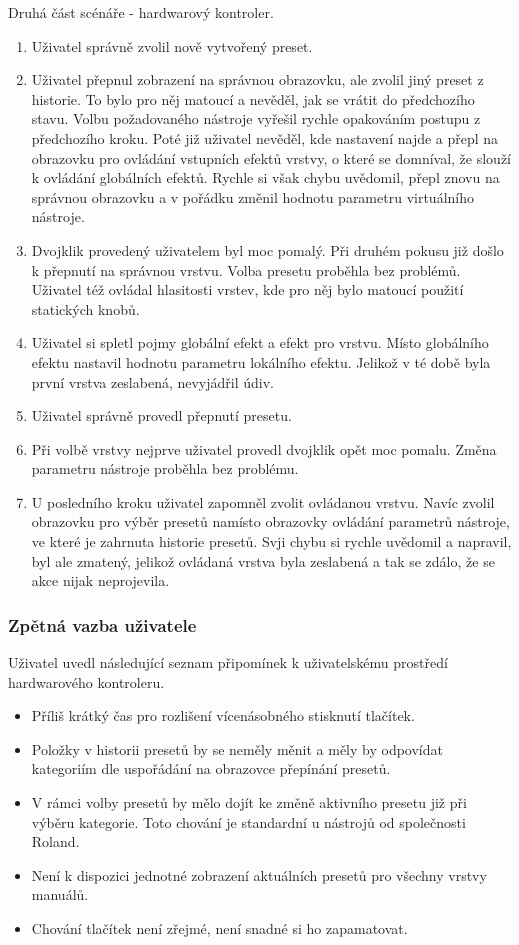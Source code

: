 \documentclass[thesis=M,czech]{FITthesis}[2019/03/06]
\begin{document}
			\noindent
			Druhá část scénáře - hardwarový kontroler.
			\begin{enumerate}
				\item Uživatel správně zvolil nově vytvořený preset.
				\item Uživatel přepnul zobrazení na správnou obrazovku, ale zvolil jiný preset z historie. To bylo pro něj matoucí a nevěděl, jak se vrátit do předchozího stavu. Volbu požadovaného nástroje vyřešil rychle opakováním postupu z předchozího kroku.
				Poté již uživatel nevěděl, kde nastavení najde a přepl na obrazovku pro ovládání vstupních efektů vrstvy, o které se domníval, že slouží k ovládání globálních efektů. Rychle si však chybu uvědomil, přepl znovu na správnou obrazovku a v pořádku změnil hodnotu parametru virtuálního nástroje.
				\item Dvojklik provedený uživatelem byl moc pomalý. Při druhém pokusu již došlo k přepnutí na správnou vrstvu.
				Volba presetu proběhla bez problémů. Uživatel též ovládal hlasitosti vrstev, kde pro něj bylo matoucí použití statických knobů.
				\item Uživatel si spletl pojmy globální efekt a efekt pro vrstvu. Místo globálního efektu nastavil hodnotu parametru lokálního efektu. Jelikož v té době byla první vrstva zeslabená, nevyjádřil údiv.
				\item Uživatel správně provedl přepnutí presetu.
				\item Při volbě vrstvy nejprve uživatel provedl dvojklik opět moc pomalu. Změna parametru nástroje proběhla bez problému.
				\item U posledního kroku uživatel zapomněl zvolit ovládanou vrstvu. Navíc zvolil obrazovku pro výběr presetů namísto obrazovky ovládání parametrů nástroje, ve které je zahrnuta historie presetů. Svji chybu si rychle uvědomil a napravil, byl ale zmatený, jelikož ovládaná vrstva byla zeslabená a tak se zdálo, že se akce nijak neprojevila.
			\end{enumerate}
		
			\subsubsection{Zpětná vazba uživatele}
				Uživatel uvedl následující seznam připomínek k uživatelskému prostředí hardwarového kontroleru.
				\begin{itemize}
					\item Příliš krátký čas pro rozlišení vícenásobného stisknutí tlačítek.
					\item Položky v historii presetů by se neměly měnit a měly by odpovídat kategoriím dle uspořádání na obrazovce přepínání presetů.
					\item V rámci volby presetů by mělo dojít ke změně aktivního presetu již při výběru kategorie. Toto chování je standardní u nástrojů od společnosti Roland.
					\item Není k dispozici jednotné zobrazení aktuálních presetů pro všechny vrstvy manuálů.
					\item Chování tlačítek není zřejmé, není snadné si ho zapamatovat.
				\end{itemize}
			
\end{document}
